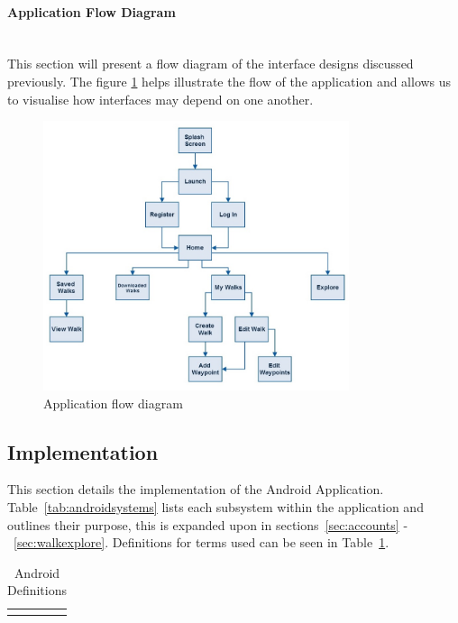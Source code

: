 \documentclass[11pt,a4paper]{report}
\begin{document}
\paragraph*{Application Flow Diagram}\mbox{}\\

This section will present a flow diagram of the interface designs discussed previously. The figure \ref{fig:flow} helps illustrate the flow of the application and allows us to visualise how interfaces may depend on one another.

\begin{figure}[H]
    \centering
    \includegraphics[width=0.8\textwidth]{chris/flow}
    \caption{Application flow diagram}
    \label{fig:flow}
\end{figure}

\subsection{Implementation}
This section details the implementation of the Android Application. Table~\ref{tab:androidsystems} lists each subsystem within the application and outlines their purpose, this is expanded upon in sections~\ref{sec:accounts} -~\ref{sec:walkexplore}. Definitions for terms used can be seen in Table~\ref{tab:androidDefs}.

\begin{longtable}{|p{2cm}|p{8cm}|}
\hline \caption{Android Definitions} \label{tab:androidDefs} \endlastfoot
\end{longtable}
\end{document}
